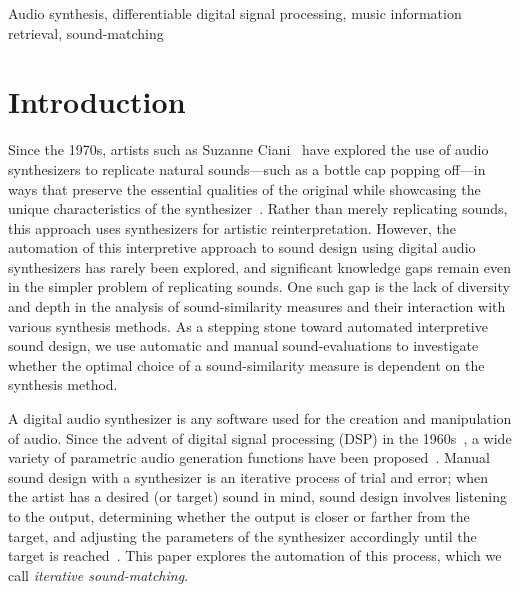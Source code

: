 \documentclass[lettersize,journal]{IEEEtran}
\providecommand{\gls}[1]{#1}
\begin{document}
\begin{IEEEkeywords}
Audio synthesis, differentiable digital signal processing, music information retrieval, sound-matching
\end{IEEEkeywords}

\section{Introduction}
Since the 1970s, artists such as Suzanne Ciani~\cite{ciani_life_in_waves} have explored the use of audio synthesizers to replicate natural sounds—such as a bottle cap popping off—in ways that preserve the essential qualities of the original while showcasing the unique characteristics of the synthesizer~\cite{creativecherep2024}. Rather than merely replicating sounds, this approach uses synthesizers for artistic reinterpretation. However, the automation of this interpretive approach to sound design using digital audio synthesizers has rarely been explored, and significant knowledge gaps remain even in the simpler problem of replicating sounds. One such gap is the lack of diversity and depth in the analysis of sound-similarity measures and their interaction with various synthesis methods. As a stepping stone toward automated interpretive sound design, we use automatic and manual sound-evaluations to investigate whether the optimal choice of a sound-similarity measure is dependent on the synthesis method.

A digital audio synthesizer is any software used for the creation and manipulation of audio. Since the advent of digital signal processing (\gls{DSP}) in the 1960s~\cite{stranneby2004digital}, a wide variety of parametric audio generation functions have been proposed~\cite{lyons1997understanding,russ1999sound,shier2020spiegelib}. Manual sound design with a synthesizer is an iterative process of trial and error; when the artist has a desired (or target) sound in mind, sound design involves listening to the output, determining whether the output is closer or farther from the target, and adjusting the parameters of the synthesizer accordingly until the target is reached~\cite{russ1999sound}. This paper explores the automation of this process, which we call \textit{iterative sound-matching}. 
\end{document}
